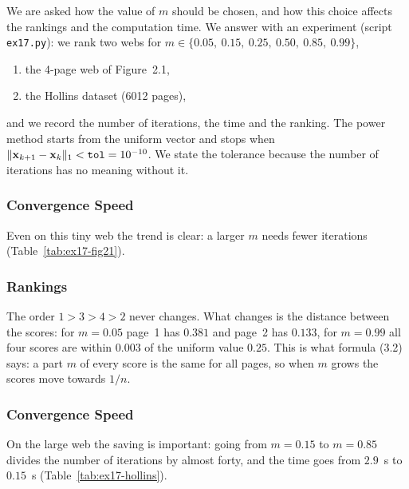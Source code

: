 

We are asked how the value of $m$ should be chosen, and how this choice affects the rankings and the computation time.
We answer with an experiment (script \texttt{ex17.py}): we rank two webs for
$m \in \{0.05,\ 0.15,\ 0.25,\ 0.50,\ 0.85,\ 0.99\}$,
\begin{enumerate}
  \item the 4-page web of Figure~2.1,
  \item the Hollins dataset (6012 pages),
\end{enumerate}
and we record the number of iterations, the time and the ranking.
The power method starts from the uniform vector and stops when $\|\mathbf{x}_{k+1}-\mathbf{x}_k\|_1 < \texttt{tol} = 10^{-10}$.
We state the tolerance because the number of iterations has no meaning without it.


\subsubsection*{Convergence Speed}

Even on this tiny web the trend is clear: a larger $m$ needs fewer iterations (Table~\ref{tab:ex17-fig21}).



\subsubsection*{Rankings}

The order $1 > 3 > 4 > 2$ never changes.
What changes is the distance between the scores: for $m = 0.05$ page~1 has $0.381$ and page~2 has $0.133$, for $m = 0.99$ all four scores are within $0.003$ of the uniform value $0.25$.
This is what formula (3.2) says: a part $m$ of every score is the same for all pages, so when $m$ grows the scores move towards $1/n$.


\subsubsection*{Convergence Speed}

On the large web the saving is important: going from $m = 0.15$ to $m = 0.85$ divides the number of iterations by almost forty, and the time goes from $2.9$~s to $0.15$~s (Table~\ref{tab:ex17-hollins}).

